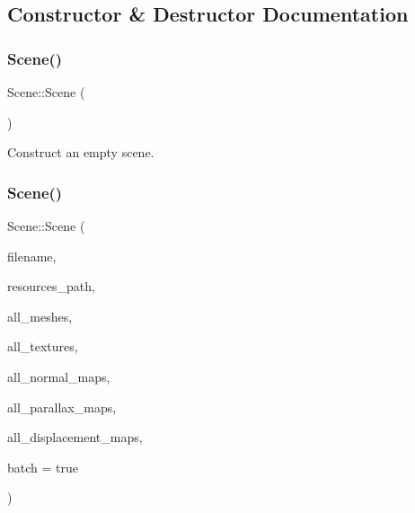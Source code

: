\subsection{Constructor \& Destructor Documentation}
\mbox{\label{class_scene_ad10176d75a9cc0da56626f682d083507}} 
\subsubsection{\texorpdfstring{Scene()}{Scene()}\hspace{0.1cm}{\footnotesize\ttfamily [1/2]}}
{\footnotesize\ttfamily Scene\+::\+Scene (\begin{DoxyParamCaption}{ }\end{DoxyParamCaption})}

Construct an empty scene. \mbox{\label{class_scene_a5311ceba0e507f805d3c5592155880fc}} 
\subsubsection{\texorpdfstring{Scene()}{Scene()}\hspace{0.1cm}{\footnotesize\ttfamily [2/2]}}
{\footnotesize\ttfamily Scene\+::\+Scene (\begin{DoxyParamCaption}\item[{std\+::string}]{filename,  }\item[{std\+::string}]{resources\+\_\+path,  }\item[{const std\+::vector$<$ std\+::unique\+\_\+ptr$<$ \mbox{\hyperlink{class_mesh}{Mesh}} $>$$>$ \&}]{all\+\_\+meshes,  }\item[{const std\+::vector$<$ std\+::unique\+\_\+ptr$<$ \mbox{\hyperlink{class_texture}{Texture}} $>$$>$ \&}]{all\+\_\+textures,  }\item[{const std\+::vector$<$ std\+::unique\+\_\+ptr$<$ \mbox{\hyperlink{class_normal_map}{Normal\+Map}} $>$$>$ \&}]{all\+\_\+normal\+\_\+maps,  }\item[{const std\+::vector$<$ std\+::unique\+\_\+ptr$<$ \mbox{\hyperlink{class_parallax_map}{Parallax\+Map}} $>$$>$ \&}]{all\+\_\+parallax\+\_\+maps,  }\item[{const std\+::vector$<$ std\+::unique\+\_\+ptr$<$ \mbox{\hyperlink{class_displacement_map}{Displacement\+Map}} $>$$>$ \&}]{all\+\_\+displacement\+\_\+maps,  }\item[{bool}]{batch = {\ttfamily true} }\end{DoxyParamCaption})}

